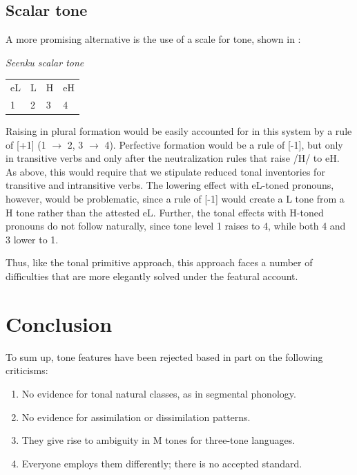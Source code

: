 \documentclass[output=paper]{langsci/langscibook}
\begin{document}
\subsection{Scalar tone}\label{sec:mcpherson:5.2}

A more promising alternative is the use of a scale for tone, shown in :

\ea\label{ex:mcpherson:26} {\it Seenku scalar tone} \\
\begin{tabular}[t]{llll}
  eL &  L & H & eH \\
  1 & 2 & 3 & 4 \\
\end{tabular}
\z

Raising in plural formation would be easily accounted for in this system by a rule of [+1] (1 $\rightarrow$ 2, 3 $\rightarrow$ 4). Perfective formation would be a rule of [-1], but only in transitive verbs and only after the neutralization rules that raise /H/ to eH. As above, this would require that we stipulate reduced tonal inventories for transitive and intransitive verbs. The lowering effect with eL-toned pronouns, however, would be problematic, since a rule of [-1] would create a L tone from a H tone rather than the attested eL. Further, the tonal effects with H-toned pronouns do not follow naturally, since tone level 1 raises to 4, while both 4 and 3 lower to 1.

Thus, like the tonal primitive approach, this approach faces a number of difficulties that are more elegantly solved under the featural account.


\section{Conclusion}\label{sec:mcpherson:SecConclusion}

To sum up, tone features have been rejected based in part on the following criticisms:

\begin{enumerate}
  \item No evidence for tonal natural classes, as in segmental phonology. 
  \item No evidence for assimilation or dissimilation patterns.
  \item They give rise to ambiguity in M tones for three-tone languages.
  \item Everyone employs them differently; there is no accepted standard.
\end{enumerate}
\end{document}
